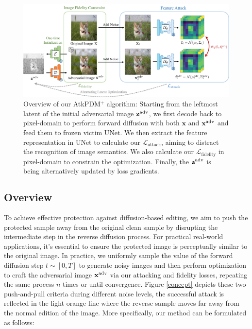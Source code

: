 \begin{figure}[t]
    \centering
    \includegraphics[width=1\linewidth]{figures/framework.pdf}
    \caption{Overview of our AtkPDM$^{+}$ algorithm: Starting from the leftmost latent of the initial adversarial image  $\mathbf{z}^{\adv}$, we first decode back to pixel-domain to perform forward diffusion with both $\mathbf{x}$ and $\mathbf{x}^{\adv}$ and feed them to frozen victim UNet. We then extract the feature representation in UNet to calculate our $\mathcal{L}_\text{attack}$, aiming to distract the recognition of image semantics. We also calculate our $\mathcal{L}_\text{fidelity}$ in pixel-domain to constrain the optimization. Finally, the $\mathbf{z}^{\adv}$ is being alternatively updated by loss gradients.}
    \label{framework}
\end{figure}


\subsection{Overview}

To achieve effective protection against diffusion-based editing, we aim to push the protected sample away from the original clean sample by disrupting the intermediate step in the reverse diffusion process. For practical real-world applications, it's essential to ensure the protected image is perceptually similar to the original image. In practice, we uniformly sample the value of the forward diffusion step $t \sim [0, T]$ to generate noisy images and then perform optimization to craft the adversarial image $\mathbf{x}^{\adv}$ via our attacking and fidelity losses, repeating the same process $n$ times or until convergence. Figure \ref{concept} depicts these two push-and-pull criteria during different noise levels, the successful attack is reflected in the light orange line where the reverse sample moves far away from the normal edition of the image. More specifically, our method can be formulated as follows:

